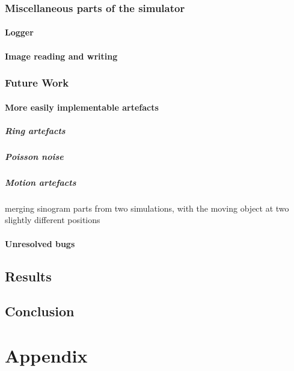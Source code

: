 \section{Miscellaneous parts of the simulator}
\subsection{Logger}
\subsection{Image reading and writing}
\section{Future Work}
\subsection{More easily implementable artefacts}
\subsubsection{Ring artefacts}
\subsubsection{Poisson noise}
\subsubsection{Motion artefacts}
merging sinogram parts from two simulations, with the moving object at two slightly different positions\cite{deMan}
\subsection{Unresolved bugs}

\chapter{Results}

\chapter{Conclusion}




%
%
\part*{Appendix}


